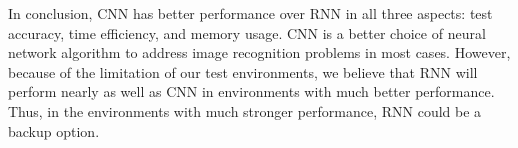 \documentclass[letterpaper]{article} %
\begin{document}
	In conclusion, CNN has better performance over RNN in all three aspects: test accuracy, time efficiency, and memory usage. CNN is a better choice of neural network algorithm to address image recognition problems in most cases. However, because of the limitation of our test environments, we believe that RNN will perform nearly as well as CNN in environments with much better performance. Thus, in the environments with much stronger performance, RNN could be a backup option.
	
	
	
	\newpage
	
	
	
\end{document}
